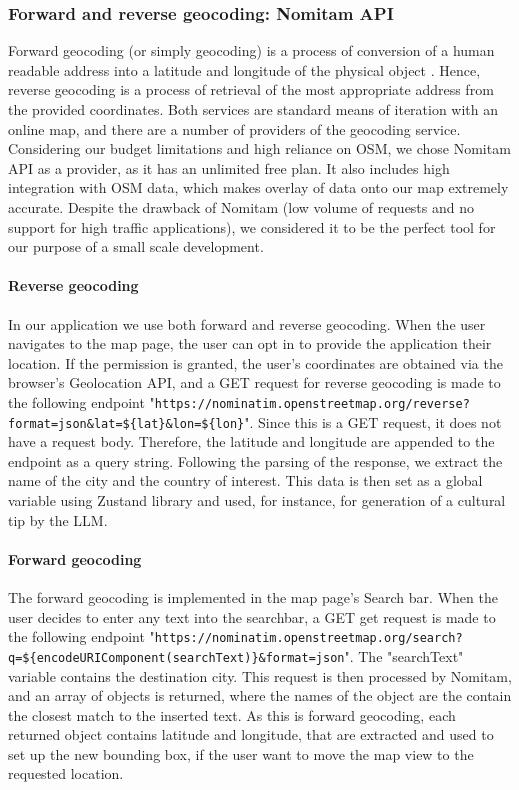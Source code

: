 \subsubsection{Forward and reverse geocoding: Nomitam API}

Forward geocoding (or simply geocoding) is a process of conversion of a human readable address into a latitude and longitude of the physical object \cite{forwardAndReverseGeocoding}. Hence, reverse geocoding is a process of retrieval of the most appropriate address from the provided coordinates. Both services are standard means of iteration with an online map, and there are a number of providers of the geocoding service. Considering our budget limitations and high reliance on OSM, we chose Nomitam API as a provider, as it has an unlimited free plan. It also includes high integration with OSM data, which makes overlay of data onto our map extremely accurate. Despite the drawback of Nomitam (low volume of requests and no support for high traffic applications), we considered it to be the perfect tool for our purpose of a small scale development. 

\paragraph{Reverse geocoding}
In our application we use both forward and reverse geocoding. When the user navigates to the map page, the user can opt in to provide the application their location. If the permission is granted, the user’s coordinates are obtained via the browser’s Geolocation API, and a GET request for reverse geocoding is made to the following endpoint "\lstinline|https://nominatim.openstreetmap.org/reverse?format=json&lat=${lat}&lon=${lon}|". Since this is a GET request, it does not have a request body. Therefore, the latitude and longitude are appended to the endpoint as a query string. Following the parsing of the response, we extract the name of the city and the country of interest. This data is then set as a global variable using Zustand library and used, for instance, for generation of a cultural tip by the LLM.

\paragraph{Forward geocoding}
The forward geocoding is implemented in the map page's Search bar. When the user decides to enter any text into the searchbar, a GET get request is made to the following endpoint "\lstinline|https://nominatim.openstreetmap.org/search?q=${encodeURIComponent(searchText)}&format=json|". The "searchText" variable contains the destination city. This request is then processed by Nomitam, and an array of objects is returned, where the names of the object are the contain the closest match to the inserted text. As this is forward geocoding, each returned object contains latitude and longitude, that are extracted and used to set up the new bounding box, if the user want to move the map view to the requested location.


